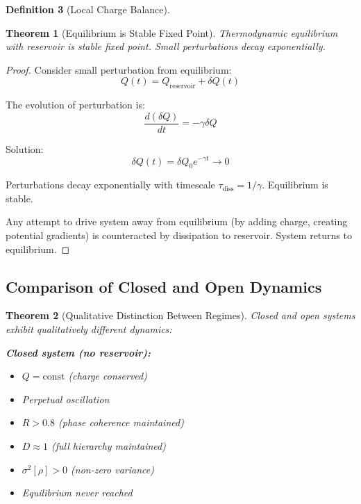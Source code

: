 \documentclass[12pt,a4paper]{article}
\theoremstyle{plain}
\newtheorem{theorem}{Theorem}[section]
\theoremstyle{definition}
\newtheorem{definition}[theorem]{Definition}
\theoremstyle{remark}
\begin{document}
\begin{definition}[Local Charge Balance]
\begin{theorem}[Equilibrium is Stable Fixed Point]
\label{thm:equilibrium_stable}
Thermodynamic equilibrium with reservoir is stable fixed point. Small perturbations decay exponentially.
\end{theorem}

\begin{proof}
Consider small perturbation from equilibrium:
\begin{equation}
Q(t) = Q_{\text{reservoir}} + \delta Q(t)
\end{equation}

The evolution of perturbation is:
\begin{equation}
\frac{d(\delta Q)}{dt} = -\gamma \delta Q
\end{equation}

Solution:
\begin{equation}
\delta Q(t) = \delta Q_0 e^{-\gamma t} \to 0
\end{equation}

Perturbations decay exponentially with timescale $\tau_{\text{diss}} = 1/\gamma$. Equilibrium is stable.

Any attempt to drive system away from equilibrium (by adding charge, creating potential gradients) is counteracted by dissipation to reservoir. System returns to equilibrium.
\end{proof}

\subsection{Comparison of Closed and Open Dynamics}

\begin{theorem}[Qualitative Distinction Between Regimes]
\label{thm:regime_distinction}
Closed and open systems exhibit qualitatively different dynamics:

\textbf{Closed system (no reservoir):}
\begin{itemize}
\item $Q = \text{const}$ (charge conserved)
\item Perpetual oscillation
\item $R > 0.8$ (phase coherence maintained)
\item $D \approx 1$ (full hierarchy maintained)
\item $\sigma^2[\rho] > 0$ (non-zero variance)
\item Equilibrium never reached
\end{itemize}


\end{theorem}
\end{definition}
\end{document}
